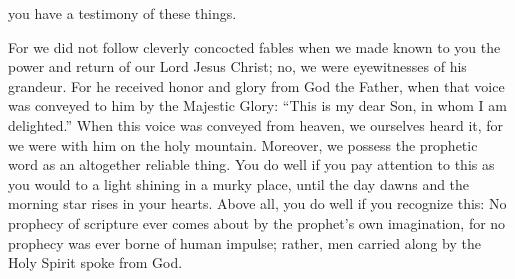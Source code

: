 {you
have
a testimony
of these things.
\par }{\PP {}For
we did
not
follow
cleverly concocted
fables
when we made known
to you
the power
and
return
of our
Lord
Jesus
Christ;
no,
we were
eyewitnesses
of his
grandeur.
For
he received
honor
and
glory
from
God
the Father,
when that voice
was conveyed
to him
by
the Majestic
Glory: “This
is
my
dear
Son,
in
whom
I
am delighted.”
When
this
voice
was conveyed
from
heaven,
we
ourselves
heard
it, for we were
with
him
on
the holy
mountain.
Moreover, we possess
the prophetic
word
as an altogether reliable thing.
You do
well
if you pay attention
to this as
you would to a light
shining
in
a murky
place,
until
the day
dawns
and
the morning star
rises
in
your
hearts.
Above
all,
you do well if you recognize
this: No
prophecy
of scripture
ever comes about
by the prophet’s own
imagination,
for
no
prophecy
was ever borne
of human
impulse;
rather,
men
carried along
by
the Holy
Spirit
spoke
from
God.

}
